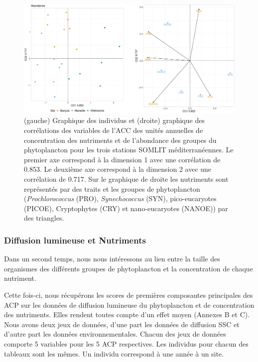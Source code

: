 \documentclass[12pt]{article}
\begin{document}
\begin{figure}
\centering
\includegraphics[width=.95\textwidth]{fig/R231_CCA_ab.pdf}
\caption{(gauche) Graphique des individus et (droite) graphique des corrélations des variables de l'ACC des unités annuelles de concentration des nutriments et de l'abondance des groupes du phytoplancton pour les trois stations SOMLIT méditerranéennes. Le premier axe correspond à la dimension 1 avec une corrélation de 0.853. Le deuxième axe correspond à la dimension 2 avec une corrélation de 0.717. Sur le graphique de droite les nutriments sont représentés par des traits et les groupes de phytoplancton (\textit{Prochlorococcus} (PRO), \textit{Synechococcus} (SYN), pico-eucaryotes (PICOE), Cryptophytes (CRY) et nano-eucaryotes (NANOE)) par des triangles.}
\label{cca_ab}
\end{figure}

\subsubsection{Diffusion lumineuse et Nutriments}

Dans un second temps, nous nous intéressons au lien entre la taille des organismes des différents groupes de phytoplancton et la concentration de chaque nutriment.   


Cette fois-ci, nous récupérons les scores de premières composantes principales des ACP sur les données de diffusion lumineuse du phytoplancton et de concentration des nutriments. Elles rendent toutes compte d’un effet moyen (Annexes B et C). Nous avons deux jeux de données, d’une part les données de diffusion SSC et d’autre part les données environnementales. Chacun des jeux de données comporte 5 variables pour les 5 ACP respectives. Les individus pour chacun des tableaux sont les mêmes. Un individu correspond à une année à un site.
\end{document}
